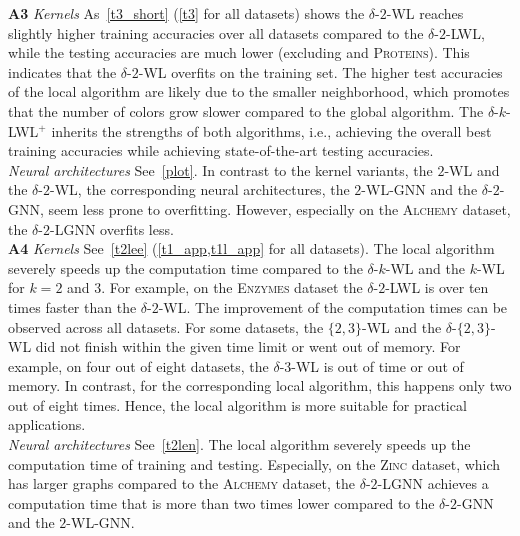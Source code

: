 \documentclass{article}
\newcommand{\xhdr}[1]{{\noindent\bfseries #1}}
\theoremstyle{definition}
\newcommand{\kwl}{$k$-\textsf{WL}\xspace}
\newcommand{\deltakwl}{$\delta$-$k$-\textsf{WL}\xspace}
\newcommand{\pluskwl}{$\delta$-$k$-\textsf{LWL}$^+$\xspace}
\begin{document}
\xhdr{A3} \textit{Kernels} As~\cref{t3_short} (\cref{t3} for all datasets) shows the $\delta$-$2$-\textsf{WL} reaches slightly higher training accuracies over all datasets compared to the $\delta$-$2$-\textsf{LWL}, while the testing accuracies are much lower (excluding  and \textsc{Proteins}). This indicates that the  $\delta$-$2$-\textsf{WL} overfits on the training set. The higher test accuracies of the local algorithm are likely due to the smaller neighborhood, which promotes that the number of colors grow slower compared to the global algorithm. The \pluskwl inherits the strengths of both algorithms, i.e., achieving the overall best training accuracies while achieving state-of-the-art testing accuracies.\\
\textit{Neural architectures} See~\cref{plot}. In contrast to the kernel variants, the $2$-\textsf{WL} and the $\delta$-$2$-\textsf{WL}, the corresponding neural architectures, the $2$-\textsf{WL-GNN} and the $\delta$-$2$-\textsf{GNN}, seem less prone to overfitting. However, especially on the \textsc{Alchemy} dataset, the $\delta$-$2$-\textsf{LGNN} overfits less. \\
\textbf{A4}
\textit{Kernels} See~\cref{t2lee} (\cref{t1_app,t1l_app} for all datasets). The local algorithm severely speeds up the computation time compared to the \deltakwl and the \kwl for $k=2$ and $3$. For example, on the \textsc{Enzymes} dataset the $\delta$-$2$-\textsf{LWL} is over ten times faster than the $\delta$-$2$-\textsf{WL}.  The improvement of the computation times can be observed across all datasets.  For some datasets, the $\{2,3\}$-\textsf{WL} and the $\delta$-$\{2,3\}$-\textsf{WL} did not finish within the given time limit or went out of memory. For example, on four out of eight datasets, the $\delta$-3-\textsf{WL} is out of time or out of memory. In contrast, for the corresponding local algorithm, this happens only two out of eight times. Hence, the local algorithm is more suitable for practical applications. \\
\textit{Neural architectures} See~\cref{t2len}. The local algorithm severely speeds up the computation time of training and testing. Especially, on the \textsc{Zinc} dataset, which has larger graphs compared to the \textsc{Alchemy} dataset, the $\delta$-$2$-\textsf{LGNN} achieves a computation time that is more  than two times lower compared to the $\delta$-$2$-\textsf{GNN} and the $2$-\textsf{WL-GNN}.
\end{document}
